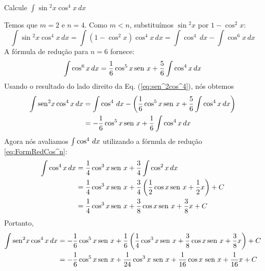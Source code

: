 \cleardoublepage\documentclass[../main.tex]{subfiles}
\begin{document}
\begin{ex}~
\\ Calcule $\int\sin\!\!^2 x\cos^4 x\, dx$
\begin{sol}
Temos que \(m=2\) e \(n=4\). Como \(m< n\), substituímos \(\sin\!\!^2 x\) por \(1-\cos^2 x\):
\begin{equation}
    \int\sin\!\!^2 x\cos^4 x\, dx=\int (1-\cos^2 x)\cos^4 x\, dx=\int \cos^4\, dx-\int \cos^6 x\, dx\label{eq:sen^2cos^4}
\end{equation}
A fórmula de redução para $n=6$ fornece:
 \begin{equation*}
   \int \cos^6 x \, dx=\frac{1}{6}\cos^5 x\operatorname{sen}\, x+\frac{5}{6}\int \cos^4 x \, dx
\end{equation*}
Usando o resultado do lado direito da Eq. (\ref{eq:sen^2cos^4}), nós obtemos
\begin{align*}
     \int\operatorname{sen}\,\!\!^2 x\cos^4 x\, dx & =\int \cos^4\, dx-\left(\frac{1}{6}\cos^5 x\operatorname{sen}\, x+\frac{5}{6}\int \cos^4 x \, dx\right)\\
     &=-\frac{1}{6}\cos^5x \operatorname{sen}\, x+\frac{1}{6}\int \cos^4 x \, dx
\end{align*}
Agora nós avaliamos $\int \cos^4 \, dx$ utilizando a fórmula de redução \ref{eq:FormRedCos^n}:
\begin{align*}
    \int \cos^4 x \, dx&=\frac{1}{4}\cos^3 x\operatorname{sen}\, x+\frac{3}{4}\int \cos^2 x \, dx\\
    &=\frac{1}{4}\cos^3 x\operatorname{sen}\, x+\frac{3}{4}\left(\frac{1}{2}\cos x\operatorname{sen}\, x+\frac{1}{2}x\right)+C\\
    &=\frac{1}{4}\cos^3 x\operatorname{sen}\, x+\frac{3}{8}\cos x \operatorname{sen}\, x+\frac{3}{8}x+C
\end{align*}
Portanto, 
\begin{align*}
      \int\operatorname{sen}\,\!\!^2 x\cos^4 x\, dx & =-\frac{1}{6}\cos^5x \operatorname{sen}\, x+\frac{1}{6}\left(\frac{1}{4}\cos^3 x\operatorname{sen}\, x+\frac{3}{8}\cos x \operatorname{sen}\, x+\frac{3}{8}x\right)+C\\
      &=-\frac{1}{6}\cos^5x \operatorname{sen}\, x+\frac{1}{24}\cos^3 x\, \operatorname{sen}\, x+\frac{1}{16}\cos x\, \operatorname{sen}\, x+\frac{1}{16}x+C
\end{align*}
\end{sol}

\end{ex}
\end{document}
